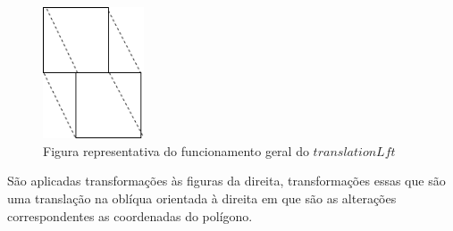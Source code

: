 \documentclass[a4paper]{article}
\newcommand{\Varid}[1]{\mathit{#1}}
\begin{document}
\begin{figure}[H]
\begin{center}
    \includegraphics[width=3cm]{translationleft} 
    \caption{Figura representativa do funcionamento geral do \ensuremath{\Varid{translationLft}}}
\end{center}
\end{figure}


\par São aplicadas transformações às figuras da direita, transformações essas que são uma 
translação na oblíqua orientada à direita em que são as alterações correspondentes as 
coordenadas do polígono.
\end{document}
